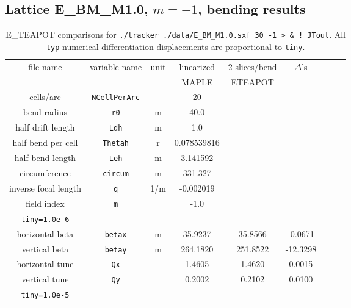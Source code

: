 \documentclass[12pt]{article}
\begin{document}
\subsection{Lattice E\_BM\_M1.0, $m=-1$, bending results}
%
\begin{table}[h]
\caption{\label{tbl:benchmarkParams.M1.0}E\_TEAPOT comparisons for
{\tt ./tracker ./data/E\_BM\_M1.0.sxf 30 -1 > \& ! JTout}.
All {\tt typ} numerical differentiation displacements are proportional to {\tt tiny}.
} 
\medskip
\centering
\begin{tabular}{|c|c|c|c|c|c|c|c|c|}           \hline
file name         & variable name     & unit & linearized    & 2 slices/bend & $\Delta$'s  \\
                  &                   &      &   MAPLE       &     ETEAPOT   &             \\ \hline
cells/arc         & {\tt NCellPerArc} &      &      20       &               &             \\
bend radius       &  {\tt r0}         &  m   &     40.0      &               &    \\
half drift length &  {\tt Ldh}        &  m   &      1.0      &               &    \\
half bend per cell & {\tt Thetah}     &  r   &   0.078539816 &               &    \\
half bend length  & {\tt Leh}         &  m   &    3.141592   &               &    \\
circumference     & {\tt circum}      &  m   &   331.327     &               &    \\
inverse focal length &  {\tt q}       & 1/m  &    -0.002019  &               &    \\ 
field index       &  {\tt m}          &      &     -1.0      &               &    \\ \hline
 {\tt tiny=1.0e-6} &                  &      &               &               &     \\ \hline 
horizontal beta  & {\tt betax}        &  m   &    35.9237    &  35.8566      &  -0.0671 \\ 
vertical beta     & {\tt betay}       &  m   &   264.1820    & 251.8522      &  -12.3298 \\ 
horizontal tune  &  {\tt Qx}          &      &     1.4605    &   1.4620      &  0.0015 \\ 
vertical tune     &  {\tt Qy}         &      &     0.2002    &   0.2102      &  0.0100 \\ \hline
 {\tt tiny=1.0e-5} &                  &      &               &               &          \\ \hline 

\end{tabular}
\end{table}
\end{document}
